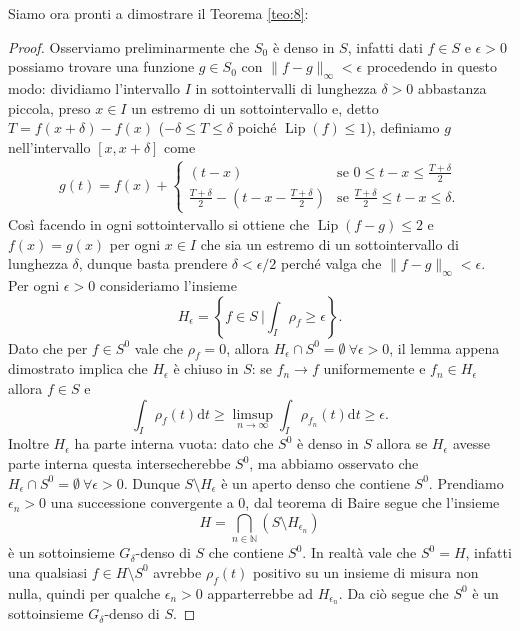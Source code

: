 \documentclass[a4paper,11pt]{book}
\theoremstyle{plain}
\theoremstyle{definition}
\theoremstyle{remark}
\newcommand{\N}{\mathbb{N}}
\newcommand{\norm}[1]{\lVert#1\rVert}
\newcommand{\diff}{\text{d}}
\DeclareMathOperator{\Lip}{Lip}
\begin{document}
Siamo ora pronti a dimostrare il Teorema \ref{teo:8}:
\begin{proof}
	Osserviamo preliminarmente che $S_{0}$ è denso in $S$, infatti dati $f\in S$ e $\epsilon>0$ possiamo trovare una funzione $g\in S_{0}$ con $\norm{f-g}_{\infty}<\epsilon$ procedendo in questo modo: dividiamo l'intervallo $I$ in sottointervalli di lunghezza $\delta>0$ abbastanza piccola, preso $x\in I$ un estremo di un sottointervallo e, detto $T=f(x+\delta)-f(x)$ ($-\delta\leq T\leq \delta$ poiché $\Lip(f)\leq 1$), definiamo $g$ nell'intervallo $[x,x+\delta]$ come
	\begin{align*}
		g(t) = f(x)+\begin{cases}
					(t-x) &\text{se }0\leq t-x\leq \frac{T+\delta}{2}\\
					\frac{T+\delta}{2}-\left(t-x-\frac{T+\delta}{2}\right) &\text{se }\frac{T+\delta}{2}\leq t-x\leq \delta.
				\end{cases}
	\end{align*}
	Così facendo in ogni sottointervallo si ottiene che $\Lip(f-g)\leq 2$ e $f(x)=g(x)$ per ogni $x\in I$ che sia un estremo di un sottointervallo di lunghezza $\delta$, dunque basta prendere $\delta<\epsilon/2$ perché valga che $\norm{f-g}_{\infty}< \epsilon$.\\
	Per ogni $\epsilon > 0$ consideriamo l'insieme
	\[
		H_{\epsilon}=\left\{f\in S\ \bigg|\int_I\rho_f \geq \epsilon\right\}.
	\]
	Dato che per $f\in S^0$ vale che $\rho_f=0$, allora $H_{\epsilon}\cap S^0=\emptyset\ \forall \epsilon>0$, il lemma appena dimostrato implica che $H_{\epsilon}$ è chiuso in $S$: se $f_n\to f$ uniformemente e $f_n\in H_{\epsilon}$ allora $f\in S$ e
	\[
		\int_I \rho_f(t)\diff t\geq \limsup_{n\to\infty}\int_I\rho_{f_n}(t)\diff t\geq \epsilon.
	\]
	Inoltre $H_{\epsilon}$ ha parte interna vuota: dato che $S^0$ è denso in $S$ allora se $H_{\epsilon}$ avesse parte interna questa intersecherebbe $S^0$, ma abbiamo osservato che $H_{\epsilon}\cap S^0=\emptyset\ \forall \epsilon>0$. Dunque $S\setminus H_{\epsilon}$ è un aperto denso che contiene $S^0$. Prendiamo $\epsilon_n>0$ una successione convergente a $0$, dal teorema di Baire segue che l'insieme
	\[
		H=\bigcap_{n\in \N}(S\setminus H_{\epsilon_n})
	\]
	è un sottoinsieme $G_{\delta}$-denso di $S$ che contiene $S^0$. In realtà vale che $S^0=H$, infatti una qualsiasi $f\in H\setminus S^0$ avrebbe $\rho_f(t)$ positivo su un insieme di misura non nulla, quindi per qualche $\epsilon_n>0$ apparterrebbe ad $H_{\epsilon_n}$. Da ciò segue che $S^0$ è un sottoinsieme $G_{\delta}$-denso di $S$.
\end{proof}
\end{document}
